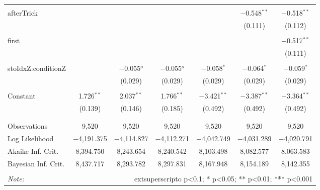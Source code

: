 \begin{table}[!htbp]
\begin{tabular}{@{\extracolsep{5pt}}lcccccc}
  & & & & & & \\ 
 afterTrick &  &  &  &  & $-$0.548$^{**}$ & $-$0.518$^{**}$ \\ 
  &  &  &  &  & (0.111) & (0.112) \\ 
  & & & & & & \\ 
 first &  &  &  &  &  & $-$0.517$^{**}$ \\ 
  &  &  &  &  &  & (0.111) \\ 
  & & & & & & \\ 
 stoIdxZ:conditionZ &  & $-$0.055$^{o}$ & $-$0.055$^{o}$ & $-$0.058$^{*}$ & $-$0.064$^{*}$ & $-$0.059$^{*}$ \\ 
  &  & (0.029) & (0.029) & (0.029) & (0.029) & (0.029) \\ 
  & & & & & & \\ 
 Constant & 1.726$^{**}$ & 2.037$^{**}$ & 1.766$^{**}$ & $-$3.421$^{**}$ & $-$3.387$^{**}$ & $-$3.364$^{**}$ \\ 
  & (0.139) & (0.146) & (0.185) & (0.492) & (0.492) & (0.492) \\ 
  & & & & & & \\ 
\hline \\[-1.8ex] 
Observations & 9,520 & 9,520 & 9,520 & 9,520 & 9,520 & 9,520 \\ 
Log Likelihood & $-$4,191.375 & $-$4,114.827 & $-$4,112.271 & $-$4,042.749 & $-$4,031.289 & $-$4,020.791 \\ 
Akaike Inf. Crit. & 8,394.750 & 8,243.654 & 8,240.542 & 8,103.498 & 8,082.577 & 8,063.583 \\ 
Bayesian Inf. Crit. & 8,437.717 & 8,293.782 & 8,297.831 & 8,167.948 & 8,154.189 & 8,142.355 \\ 
\hline 
\hline \\[-1.8ex] 
\textit{Note:}  & \multicolumn{6}{r}{	extsuperscript{o} p<0.1; * p<0.05; ** p<0.01; *** p<0.001} \\ 
\end{tabular} 
\end{table} 
